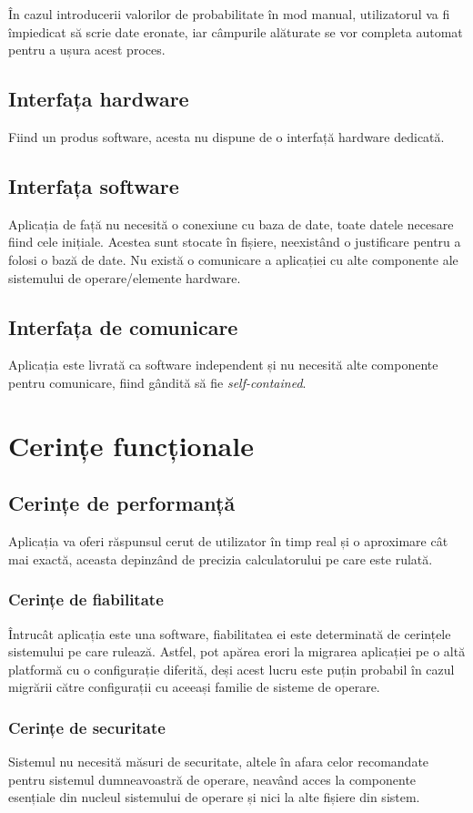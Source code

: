 \documentclass{scrreprt}
\begin{document}
În cazul introducerii valorilor de probabilitate în mod manual, utilizatorul va fi împiedicat să scrie date eronate, iar câmpurile alăturate se vor completa automat pentru a ușura acest proces.

\section{Interfața hardware}
Fiind un produs software, acesta nu dispune de o interfață hardware dedicată.

\section{Interfața software}
Aplicația de față nu necesită o conexiune cu baza de date, toate datele necesare fiind cele inițiale. Acestea sunt stocate în fișiere, neexistând o justificare pentru a folosi o bază de date. Nu există o comunicare a aplicației cu alte componente ale sistemului de operare/elemente hardware.

\section{Interfața de comunicare}
Aplicația este livrată ca software independent și nu necesită alte componente pentru comunicare, fiind gândită să fie \textit{self-contained}.

\chapter{Cerințe funcționale}

\section{Cerințe de performanță}
Aplicația va oferi răspunsul cerut de utilizator în timp real și o aproximare cât mai exactă, aceasta depinzând de precizia calculatorului pe care este rulată.

\subsection{Cerințe de fiabilitate}
Întrucât aplicația este una software, fiabilitatea ei este determinată de cerințele sistemului pe care rulează. Astfel, pot apărea erori la migrarea aplicației pe o altă platformă cu o configurație diferită, deși acest lucru este puțin probabil în cazul migrării către configurații cu aceeași familie de sisteme de operare.

\subsection{Cerințe de securitate}
Sistemul nu necesită măsuri de securitate, altele în afara celor recomandate pentru sistemul dumneavoastră de operare, neavând acces la componente esențiale din nucleul sistemului de operare și nici la alte fișiere din sistem.
\end{document}
